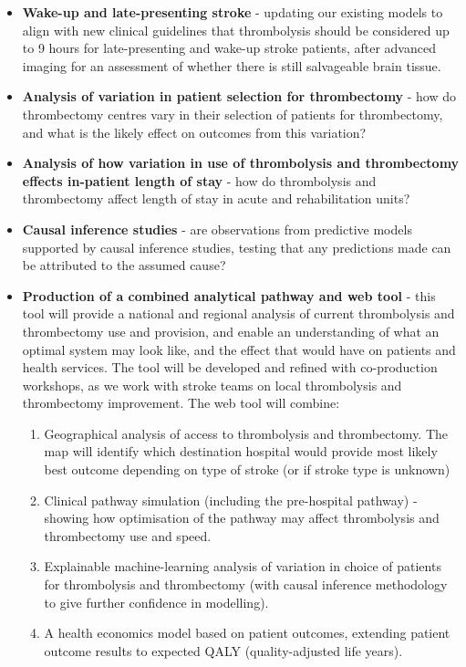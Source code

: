 \begin{itemize}

    \item \textbf{Wake-up and late-presenting stroke} - updating our existing models to align with new clinical guidelines that thrombolysis should be considered up to 9 hours for late-presenting and wake-up stroke patients, after advanced imaging for an assessment of whether there is still salvageable brain tissue.
    
    \item \textbf{Analysis of variation in patient selection for thrombectomy} - how do thrombectomy centres vary in their selection of patients for thrombectomy, and what is the likely effect on outcomes from this variation?

    \item \textbf{Analysis of how variation in use of thrombolysis and thrombectomy effects in-patient length of stay} - how do thrombolysis and thrombectomy affect length of stay in acute and rehabilitation units?

    \item \textbf{Causal inference studies} - are observations from predictive models supported by causal inference studies, testing that any predictions made can be attributed to the assumed cause?

    \item \textbf{Production of a combined analytical pathway and web tool} - this tool will provide a national and regional analysis of current thrombolysis and thrombectomy use and provision, and enable an understanding of what an optimal system may look like, and the effect that would have on patients and health services. The tool will be developed and refined with co-production workshops, as we work with stroke teams on local thrombolysis and thrombectomy improvement. The web tool will combine:
    
    \begin{enumerate}
        \item Geographical analysis of access to thrombolysis and thrombectomy. The map will identify which destination hospital would provide most likely best outcome depending on type of stroke (or if stroke type is unknown)

        \item Clinical pathway simulation (including the pre-hospital pathway) - showing how optimisation of the pathway may affect thrombolysis and thrombectomy use and speed.

        \item Explainable machine-learning analysis of variation in choice of patients for thrombolysis and thrombectomy (with causal inference methodology to give further confidence in modelling).

        \item A health economics model based on patient outcomes, extending patient outcome results to expected QALY (quality-adjusted life years).
    \end{enumerate} 
    
\end{itemize}

